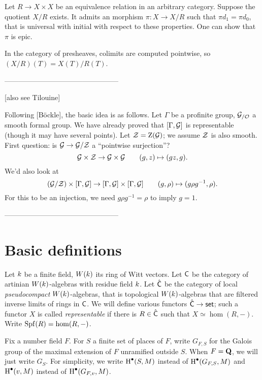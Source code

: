 \documentclass[phd,cornellheadings,draft]{cornell}
\begin{document}
Let $R\to X\times X$ be an equivalence relation in an arbitrary category. Suppose 
the quotient $X/R$ exists. It admits an morphism $\pi\colon X\to X/R$ such that 
$\pi d_1 = \pi d_0$, that is universal with initial with respect to these 
properties. One can show that $\pi$ is epic. 

In the category of presheaves, colimits are computed pointwise, so 
$(X/R)(T) = X(T)/R(T)$. 

------------------------------------------------

[also see Tilouine]

Following [B\"ockle], the basic idea is as follows. Let $\Gamma$ be a profinite 
group, $\mathcal{G}_{/\mathcal{O}}$ a smooth formal group. We have already proved that 
$[\Gamma,\mathcal{G}]$ is representable (though it may have several points). Let 
$\mathcal{Z}=\operatorname{Z}(\mathcal{G})$; we assume $\mathcal{Z}$ is also smooth. First question: is 
$\mathcal{G}\to \mathcal{G}/\mathcal{Z}$ a ``pointwise surjection''?
\[
  \mathcal{G}\times \mathcal{Z}\to \mathcal{G}\times \mathcal{G} \qquad (g,z)\mapsto (g z,g) .
\]
We'd also look at 
\[
  (\mathcal{G}/\mathcal{Z})\times [\Gamma,\mathcal{G}]\to [\Gamma,\mathcal{G}]\times [\Gamma,\mathcal{G}]\qquad (g,\rho) \mapsto (g \rho g^{-1}, \rho) .
\]
For this to be an injection, we need $g\rho g^{-1} = \rho$ to imply 
$g=1$. 

------------------------------------------------





\section{Basic definitions}

Let $k$ be a finite field, $W(k)$ its ring of Witt vectors. 
Let $\mathsf{C}$ be the category of artinian $W(k)$-algebras with residue field $k$. 
Let $\hat{\mathsf{C}}$ be the category of local \emph{pseudocompact} $W(k)$-algebras, that is topological $W(k)$-algebras that are filtered inverse limits of rings in $\mathsf{C}$. 
We will define various functors $\hat{\mathsf{C}}\to \mathsf{set}$; such a functor $X$ is called \emph{representable} if there is $R\in \hat{\mathsf{C}}$ such that $X\simeq \hom(R,-)$. 
Write $\operatorname{Spf}(R)=\hom(R,-)$. 

Fix a number field $F$. 
For $S$ a finite set of places of $F$, write $G_{F,S}$ for the Galois group of the maximal extension of $F$ unramified outside $S$. 
When $F=\mathbf{Q}$, we will just write $G_S$. For simplicity, we write 
$\operatorname{H}^\bullet(S,M)$ instead of $\operatorname{H}^\bullet(G_{F,S},M)$ and 
$\operatorname{H}^\bullet(v,M)$ instead of $\operatorname{H}^\bullet(G_{F,v},M)$. 
\end{document}
